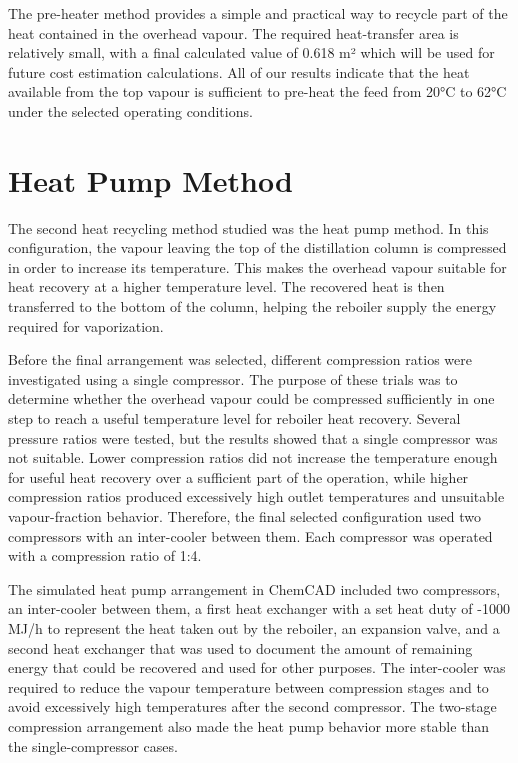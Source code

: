 The pre-heater method provides a simple and practical way to recycle
part of the heat contained in the overhead vapour. The required
heat-transfer area is relatively small, with a final calculated value of
0.618 m² which will be used for future cost estimation calculations. All
of our results indicate that the heat available from the top vapour is
sufficient to pre-heat the feed from 20°C to 62°C under the selected
operating conditions.

\section{Heat Pump Method}\label{heat-pump-method}

The second heat recycling method studied was the heat pump method. In
this configuration, the vapour leaving the top of the distillation
column is compressed in order to increase its temperature. This makes
the overhead vapour suitable for heat recovery at a higher temperature
level. The recovered heat is then transferred to the bottom of the
column, helping the reboiler supply the energy required for
vaporization.

Before the final arrangement was selected, different compression ratios
were investigated using a single compressor. The purpose of these trials
was to determine whether the overhead vapour could be compressed
sufficiently in one step to reach a useful temperature level for
reboiler heat recovery. Several pressure ratios were tested, but the
results showed that a single compressor was not suitable. Lower
compression ratios did not increase the temperature enough for useful
heat recovery over a sufficient part of the operation, while higher
compression ratios produced excessively high outlet temperatures and
unsuitable vapour-fraction behavior. Therefore, the final selected
configuration used two compressors with an inter-cooler between them.
Each compressor was operated with a compression ratio of 1:4.

The simulated heat pump arrangement in ChemCAD included two compressors,
an inter-cooler between them, a first heat exchanger with a set heat
duty of -1000 MJ/h to represent the heat taken out by the reboiler, an
expansion valve, and a second heat exchanger that was used to document
the amount of remaining energy that could be recovered and used for
other purposes. The inter-cooler was required to reduce the vapour
temperature between compression stages and to avoid excessively high
temperatures after the second compressor. The two-stage compression
arrangement also made the heat pump behavior more stable than the
single-compressor cases.

